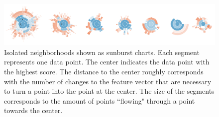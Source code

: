 \begin{figure}
\centering
\includegraphics[width=\linewidth]{figs/current/burst_d2_top}
\caption{
Isolated neighborhoods shown as sunburst charts.
Each segment represents one data point.
The center indicates the data point with the highest score.
The distance to the center roughly corresponds with the number of changes
to the feature vector that are necessary to turn a point into the point at the center.
The size of the segments corresponds to the amount of points ``flowing"
through a point towards the center.
}
\label{figs:current_burst}
\end{figure}